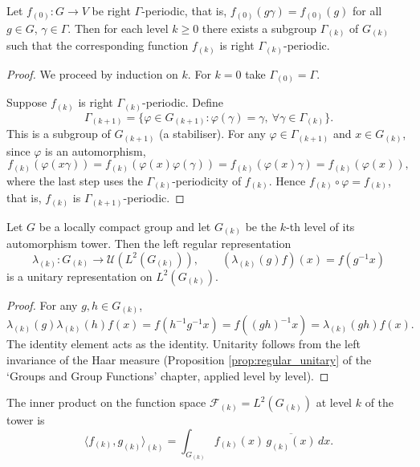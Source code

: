 \begin{proposition}\label{prop:higher_period_preservation}
Let $f_{(0)}: G\to V$ be right $\Gamma$-periodic, that is, $f_{(0)}(g\gamma)=f_{(0)}(g)$ for all $g\in G$, $\gamma\in\Gamma$. Then for each level $k\ge 0$ there exists a subgroup $\Gamma_{(k)}$ of $G_{(k)}$ such that the corresponding function $f_{(k)}$ is right $\Gamma_{(k)}$-periodic.
\end{proposition}

\begin{proof}
We proceed by induction on $k$. For $k=0$ take $\Gamma_{(0)}=\Gamma$.

Suppose $f_{(k)}$ is right $\Gamma_{(k)}$-periodic. Define
\[
\Gamma_{(k+1)} = \{\varphi\in G_{(k+1)} : \varphi(\gamma)=\gamma,\ \forall\gamma\in\Gamma_{(k)}\}.
\]
This is a subgroup of $G_{(k+1)}$ (a stabiliser). For any $\varphi\in\Gamma_{(k+1)}$ and $x\in G_{(k)}$, since $\varphi$ is an automorphism,
\[
f_{(k)}(\varphi(x\gamma)) = f_{(k)}(\varphi(x)\varphi(\gamma)) = f_{(k)}(\varphi(x)\gamma) = f_{(k)}(\varphi(x)),
\]
where the last step uses the $\Gamma_{(k)}$-periodicity of $f_{(k)}$. Hence $f_{(k)}\circ\varphi = f_{(k)}$, that is, $f_{(k)}$ is $\Gamma_{(k+1)}$-periodic.
\end{proof}

\begin{proposition}\label{prop:higher_function_regular_rep}
Let $G$ be a locally compact group and let $G_{(k)}$ be the $k$-th level of its automorphism tower. Then the left regular representation
\[
\lambda_{(k)}: G_{(k)} \to \mathcal{U}(L^2(G_{(k)})),\qquad (\lambda_{(k)}(g)f)(x) = f(g^{-1}x)
\]
is a unitary representation on $L^2(G_{(k)})$.
\end{proposition}

\begin{proof}
For any $g,h\in G_{(k)}$,
\[
\lambda_{(k)}(g)\lambda_{(k)}(h)f(x) = f(h^{-1}g^{-1}x) = f((gh)^{-1}x) = \lambda_{(k)}(gh)f(x).
\]
The identity element acts as the identity. Unitarity follows from the left invariance of the Haar measure (Proposition \ref{prop:regular_unitary} of the `Groups and Group Functions' chapter, applied level by level).
\end{proof}

\begin{corollary}\label{cor:higher_function_inner_product}
The inner product on the function space $\mathcal{F}_{(k)} = L^2(G_{(k)})$ at level $k$ of the tower is
\[
\langle f_{(k)}, g_{(k)}\rangle_{(k)} = \int_{G_{(k)}} f_{(k)}(x)\,\overline{g_{(k)}(x)}\,dx.
\]
\end{corollary}

